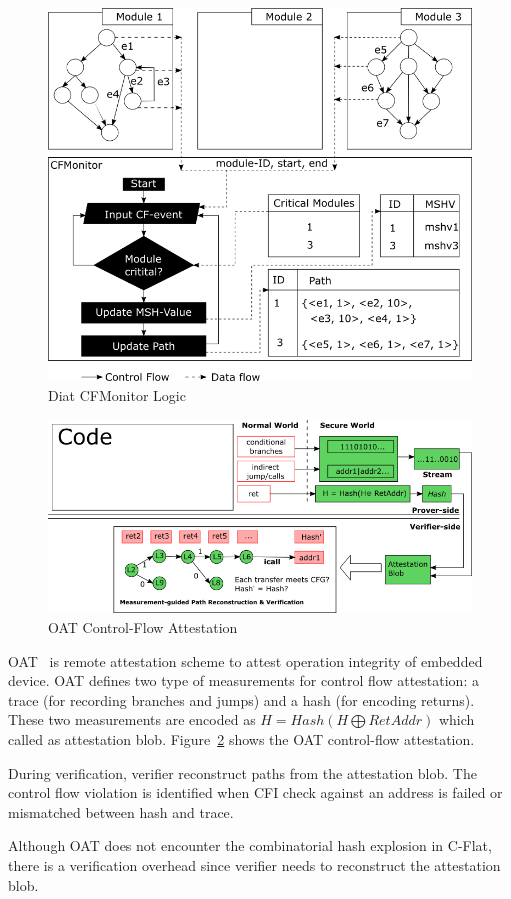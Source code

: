 \begin{figure}[htbp]
\centerline{\includegraphics[scale=.5]{Figures/01/diat-cfmonitort.png}}
\caption{Diat CFMonitor Logic}
\label{fig:diat}
\end{figure}

\begin{figure}[htbp]
\centerline{\includegraphics[scale=.85]{Figures/01/oat.png}}
\caption{OAT Control-Flow Attestation}
\label{fig:oat}
\end{figure}

OAT~\cite{sunOATAttestingOperation2020} is remote attestation scheme to attest
operation integrity of embedded device. OAT defines two type of measurements for
control flow attestation: a trace (for recording branches and jumps) and a hash
(for encoding returns). These two measurements are encoded as $H = Hash(H
\bigoplus RetAddr)$ which called as attestation blob. Figure~\ref{fig:oat} shows
the OAT control-flow attestation.

During verification, verifier reconstruct paths from the attestation blob. The
control flow violation is identified when CFI check against an address is failed
or mismatched between hash and trace.

Although OAT does not encounter the combinatorial hash explosion in C-Flat,
there is a verification overhead since verifier needs to reconstruct the
attestation blob. 
